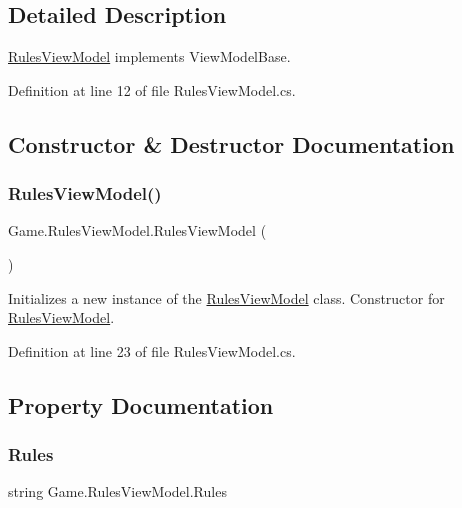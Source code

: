 \subsection{Detailed Description}
\mbox{\hyperlink{class_game_1_1_rules_view_model}{Rules\+View\+Model}} implements View\+Model\+Base. 



Definition at line 12 of file Rules\+View\+Model.\+cs.



\subsection{Constructor \& Destructor Documentation}
\mbox{\label{class_game_1_1_rules_view_model_a726e7b2414836d379f9bd87a7a7eb458}} 
\subsubsection{\texorpdfstring{RulesViewModel()}{RulesViewModel()}}
{\footnotesize\ttfamily Game.\+Rules\+View\+Model.\+Rules\+View\+Model (\begin{DoxyParamCaption}{ }\end{DoxyParamCaption})}



Initializes a new instance of the \mbox{\hyperlink{class_game_1_1_rules_view_model}{Rules\+View\+Model}} class. Constructor for \mbox{\hyperlink{class_game_1_1_rules_view_model}{Rules\+View\+Model}}. 



Definition at line 23 of file Rules\+View\+Model.\+cs.



\subsection{Property Documentation}
\mbox{\label{class_game_1_1_rules_view_model_a4557184da16245afd7e40c24901a8f89}} 
\subsubsection{\texorpdfstring{Rules}{Rules}}
{\footnotesize\ttfamily string Game.\+Rules\+View\+Model.\+Rules\hspace{0.3cm}{\ttfamily [get]}}



